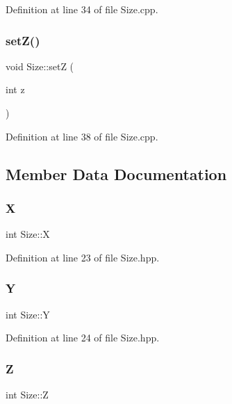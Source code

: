 Definition at line 34 of file Size.\+cpp.

\mbox{\label{class_size_a7df8db388f33ecde9a1219182bdada8e}} 
\subsubsection{\texorpdfstring{set\+Z()}{setZ()}}
{\footnotesize\ttfamily void Size\+::setZ (\begin{DoxyParamCaption}\item[{int}]{z }\end{DoxyParamCaption})}



Definition at line 38 of file Size.\+cpp.



\subsection{Member Data Documentation}
\mbox{\label{class_size_a5d467b20f596f0c48ad63d3458a59f01}} 
\subsubsection{\texorpdfstring{X}{X}}
{\footnotesize\ttfamily int Size\+::X\hspace{0.3cm}{\ttfamily [protected]}}



Definition at line 23 of file Size.\+hpp.

\mbox{\label{class_size_a5b140bf13607c8624f04dde5391f53d5}} 
\subsubsection{\texorpdfstring{Y}{Y}}
{\footnotesize\ttfamily int Size\+::Y\hspace{0.3cm}{\ttfamily [protected]}}



Definition at line 24 of file Size.\+hpp.

\mbox{\label{class_size_a80d24eaccc30b2781323b9bff4f0df05}} 
\subsubsection{\texorpdfstring{Z}{Z}}
{\footnotesize\ttfamily int Size\+::Z\hspace{0.3cm}{\ttfamily [protected]}}



